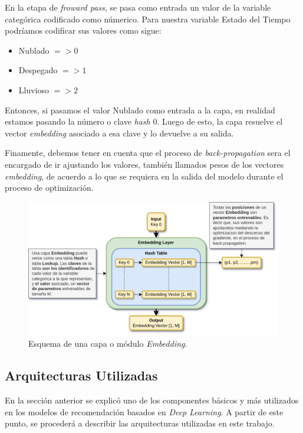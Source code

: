 \documentclass[11pt,a4paper,twoside]{thesis}
\begin{document}
En la etapa de \textit{froward pass}, se pasa como entrada un valor de la
variable categórica codificado como númerico. Para nuestra variable Estado del
Tiempo podríamos codificar sus valores como sigue:

\begin{itemize}
	\item Nublado $=> 0$
	\item Despegado $=> 1$
	\item Lluvioso $=> 2$
\end{itemize}

Entonces, si pasamos el valor Nublado como entrada a la capa, en realidad
estamos pasando la número o clave \textit{hash} $0$. Luego de esto, la capa
resuelve el vector \textit{embedding} asociado a esa clave y lo devuelve a su
salida.

Finamente, debemos tener en cuenta que el proceso de \textit{back-propagation}
sera el encargado de ir ajustando los valores, también llamados pesos de los
vectores \textit{embedding}, de acuerdo a lo que se requiera en la salida del
modelo durante el proceso de optimización.

\begin{figure}[ht!]
	\centering
	\includegraphics[width=13cm]{./images/Embedding-Layer.png}
	\caption{Esquema de una capa o módulo \textit{Embedding}.}
	\label{fig:embeddingLayer}
\end{figure}

\clearpage

\subsection{Arquitecturas Utilizadas}

En la sección anterior se explicó uno de los componentes básicos y más
utilizados en los modelos de recomendación basados en \textit{Deep Learning}. A
partir de este punto, se procederá a describir las arquitecturas utilizadas en
este trabajo.
\end{document}
